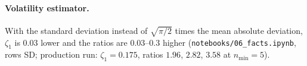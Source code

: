 \documentclass[pre,twocolumn,superscriptaddress,nofootinbib]{revtex4-2}
\begin{document}
\paragraph{Volatility estimator.}  With the standard deviation instead of $\sqrt{\pi/2}$ times the mean
absolute deviation, $\zeta_1$ is $0.03$ lower and the ratios are $0.03$--$0.3$ higher (\texttt{notebooks/06\_facts.ipynb},
rows SD; production run: $\zeta_1=0.175$, ratios $1.96$, $2.82$, $3.58$ at $n_{\min}=5$).

\clearpage

\end{document}
